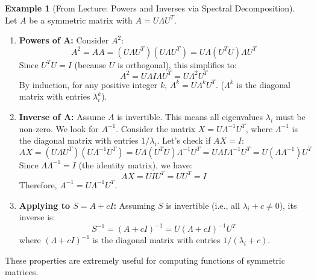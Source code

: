 \documentclass[11pt]{article}
\theoremstyle{definition}
\newtheorem{example}[theorem]{Example}
\theoremstyle{remark}
\newcommand{\trans}{^T} %
\begin{document}
\begin{example}[From Lecture: Powers and Inverses via Spectral Decomposition]
Let $A$ be a symmetric matrix with $A = U \Lambda U\trans$.
\begin{enumerate}
    \item \textbf{Powers of A:} Consider $A^2$:
    \[ A^2 = A A = (U \Lambda U\trans)(U \Lambda U\trans) = U \Lambda (U\trans U) \Lambda U\trans \]
    Since $U\trans U = I$ (because $U$ is orthogonal), this simplifies to:
    \[ A^2 = U \Lambda I \Lambda U\trans = U \Lambda^2 U\trans \]
    By induction, for any positive integer $k$, $A^k = U \Lambda^k U\trans$. ($\Lambda^k$ is the diagonal matrix with entries $\lambda_i^k$).
    \item \textbf{Inverse of A:} Assume $A$ is invertible. This means all eigenvalues $\lambda_i$ must be non-zero. We look for $A^{-1}$. Consider the matrix $X = U \Lambda^{-1} U\trans$, where $\Lambda^{-1}$ is the diagonal matrix with entries $1/\lambda_i$. Let's check if $AX = I$:
    \[ AX = (U \Lambda U\trans)(U \Lambda^{-1} U\trans) = U \Lambda (U\trans U) \Lambda^{-1} U\trans = U \Lambda I \Lambda^{-1} U\trans = U (\Lambda \Lambda^{-1}) U\trans \]
    Since $\Lambda \Lambda^{-1} = I$ (the identity matrix), we have:
    \[ AX = U I U\trans = U U\trans = I \]
    Therefore, $A^{-1} = U \Lambda^{-1} U\trans$.
    \item \textbf{Applying to $S = A+cI$:} Assuming $S$ is invertible (i.e., all $\lambda_i + c \neq 0$), its inverse is:
    \[ S^{-1} = (A+cI)^{-1} = U (\Lambda+cI)^{-1} U\trans \]
    where $(\Lambda+cI)^{-1}$ is the diagonal matrix with entries $1/(\lambda_i + c)$.
\end{enumerate}
These properties are extremely useful for computing functions of symmetric matrices.
\end{example}
\end{document}
